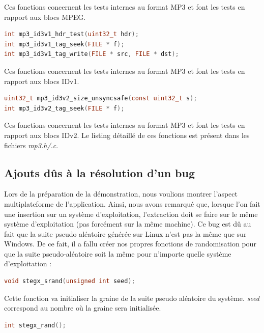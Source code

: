 \documentclass[11pt]{article}
\begin{document}
Ces fonctions concernent les tests internes au format MP3 et font les tests 
en rapport aux blocs MPEG. 
\newline

\begin{lstlisting}[language=c]
int mp3_id3v1_hdr_test(uint32_t hdr);
int mp3_id3v1_tag_seek(FILE * f);
int mp3_id3v1_tag_write(FILE * src, FILE * dst);
\end{lstlisting}

Ces fonctions concernent les tests internes au format MP3 et font les tests 
en rapport aux blocs IDv1. 
\newline
\begin{lstlisting}[language=c]
uint32_t mp3_id3v2_size_unsyncsafe(const uint32_t s);
int mp3_id3v2_tag_seek(FILE * f);
\end{lstlisting}

Ces fonctions concernent les tests internes au format MP3 et font les tests 
en rapport aux blocs IDv2. 
\newline \newline
Le listing détaillé de ces fonctions est 
présent dans les fichiers \textit{mp3.h/.c}.

\subsection{Ajouts dûs à la résolution d'un bug}

Lors de la préparation de la démonstration, nous voulions montrer l'aspect 
multiplateforme de l'application. 
Ainsi, nous avons remarqué que, lorsque l'on fait une insertion sur un 
système d'exploitation, l'extraction doit se faire sur le même système
d'exploitation (pas forcément sur la même machine). 
Ce bug est dû au fait que la suite pseudo aléatoire générée sur Linux n'est 
pas la même que sur Windows. 
De ce fait, il a fallu créer nos propres fonctions de randomisation pour que 
la suite pseudo-aléatoire soit la même pour n'importe quelle système d'exploitation : 

\begin{lstlisting}[language=c]
void stegx_srand(unsigned int seed);
\end{lstlisting}

Cette fonction va initialiser la graine de la suite pseudo aléatoire du 
système. \textit{seed} correspond au nombre où la graine sera initialisée.
\newline 

\begin{lstlisting}[language=c]
int stegx_rand();
\end{lstlisting}
\end{document}
